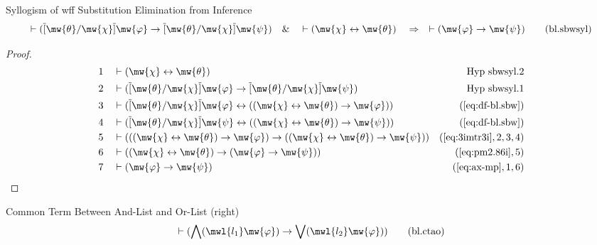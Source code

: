 \begin{lemma} Syllogism of wff Substitution Elimination
from Inference
\begin{align}
\vdash ( \overline{[} \mw{\theta} / \mw{\chi} \overline{]} \mw{\varphi}
    \rightarrow \overline{[} \mw{\theta} / \mw{\chi} \overline{]} \mw{\psi}
    )\quad\&\quad \vdash ( \mw{\chi} \leftrightarrow \mw{\theta}
    )\quad\Rightarrow\quad \vdash ( \mw{\varphi} \rightarrow \mw{\psi}
    )\label{eq:bl.sbwsyl}\tag{bl.sbwsyl}
\end{align}
\end{lemma}

\begin{proof}
\begin{align}
  1 &&  & \vdash ( \mw{\chi} \leftrightarrow \mw{\theta} )&\text{Hyp~sbwsyl.2}\notag%
  \\ 2 &&  & \vdash ( \overline{[} \mw{\theta} / \mw{\chi} \overline{]} \mw{\varphi} \rightarrow \overline{[} \mw{\theta} / \mw{\chi} \overline{]} \mw{\psi} )&\text{Hyp~sbwsyl.1}\notag%
  \\ 3 &&  & \vdash ( \overline{[} \mw{\theta} / \mw{\chi} \overline{]} \mw{\varphi} \leftrightarrow ( ( \mw{\chi} \leftrightarrow \mw{\theta} ) \rightarrow \mw{\varphi} ) )&(\mbox{\ref{eq:df-bl.sbw}})\notag
  \\ 4 &&  & \vdash ( \overline{[} \mw{\theta} / \mw{\chi} \overline{]} \mw{\psi} \leftrightarrow ( ( \mw{\chi} \leftrightarrow \mw{\theta} ) \rightarrow \mw{\psi} ) )&(\mbox{\ref{eq:df-bl.sbw}})\notag
  \\ 5 &&  & \vdash ( ( ( \mw{\chi} \leftrightarrow \mw{\theta} ) \rightarrow \mw{\varphi} ) \rightarrow ( ( \mw{\chi} \leftrightarrow \mw{\theta} ) \rightarrow \mw{\psi} ) )&(\mbox{\ref{eq:3imtr3i}},2,3,4)\notag
  \\ 6 &&  & \vdash ( ( \mw{\chi} \leftrightarrow \mw{\theta} ) \rightarrow ( \mw{\varphi} \rightarrow \mw{\psi} ) )&(\mbox{\ref{eq:pm2.86i}},5)\notag
  \\ 7 &&  & \vdash ( \mw{\varphi} \rightarrow \mw{\psi} )&(\mbox{\ref{eq:ax-mp}},1,6)\notag
\end{align}
\end{proof}

\begin{lemma} Common Term Between And-List and Or-List
(right)
\begin{align}
\vdash ( \bigwedge( \mwl{l_1} \mw{\varphi} ) \rightarrow \bigvee( \mwl{l_2}
    \mw{\varphi} ) )\label{eq:bl.ctao}\tag{bl.ctao}
\end{align}
\end{lemma}

